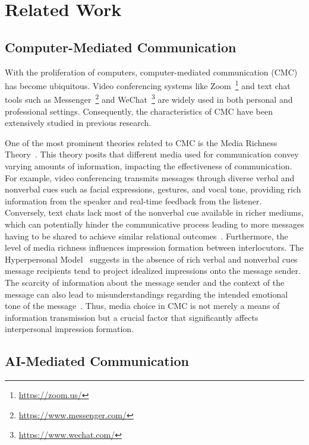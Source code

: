 \section{Related Work}
\subsection{Computer-Mediated Communication}
With the proliferation of computers, computer-mediated communication (CMC) has become ubiquitous. Video conferencing systems like Zoom~\footnote{\url{https://zoom.us/}} and text chat tools such as Messenger~\footnote{\url{https://www.messenger.com/}} and WeChat~\footnote{\url{https://www.wechat.com/}} are widely used in both personal and professional settings. Consequently, the characteristics of CMC have been extensively studied in previous research.

One of the most prominent theories related to CMC is the Media Richness Theory~\cite{MediaRichness1986}. This theory posits that different media used for communication convey varying amounts of information, impacting the effectiveness of communication. For example, video conferencing transmits messages through diverse verbal and nonverbal cues such as facial expressions, gestures, and vocal tone, providing rich information from the speaker and real-time feedback from the listener. Conversely, text chats lack most of the nonverbal cue available in richer mediums, which can potentially hinder the communicative process leading to more messages having to be shared to achieve similar relational outcomes~\cite{WALTHER1992h,WALTHER1994a}. Furthermore, the level of media richness influences impression formation between interlocutors. The Hyperpersonal Model~\cite{HyperPersonal1996} suggests in the absence of rich verbal and nonverbal cues message recipients tend to project idealized impressions onto the message sender. The scarcity of information about the message sender and the context of the message can also lead to misunderstandings regarding the intended emotional tone of the message~\cite{Byron2008-km}. Thus, media choice in CMC is not merely a means of information transmission but a crucial factor that significantly affects interpersonal impression formation.

\subsection{AI-Mediated Communication}


